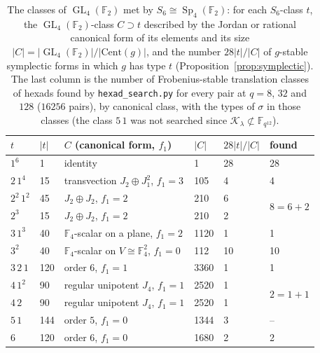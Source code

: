 ﻿\documentclass[12pt,a4paper]{amsart}
\theoremstyle{definition}
\newcommand{\F}{\mathbb{F}}
\newcommand{\Sp}{\operatorname{Sp}}
\newcommand{\GL}{\operatorname{GL}}
\newcommand{\Kk}{\mathcal{K}}
\begin{document}
\begin{table}[H]
\centering
\caption{The classes of $\GL_4(\F_2)$ met by $S_6\cong\Sp_4(\F_2)$: for each $S_6$-class $t$, the $\GL_4(\F_2)$-class $C\supset t$ described by the Jordan or rational canonical form of its elements and its size $|C|=|\GL_4(\F_2)|/|\mathrm{Cent}(g)|$, and the number $28|t|/|C|$ of $g$-stable symplectic forms in which $g$ has type $t$ (Proposition~\ref{prop:symplectic}). The last column is the number of Frobenius-stable translation classes of hexads found by \texttt{hexad\_search.py} for every pair at $q=8$, $32$ and $128$ ($16256$ pairs), by canonical class, with the types of $\sigma$ in those classes (the class $5\,1$ was not searched since $\Kk_\lambda\not\subset\F_{q^{12}}$).}\label{tab:symplectic}
\small
\begin{tabular}{@{}llllll@{}}
\toprule
$t$ & $|t|$ & $C$ (canonical form, $f_1$) & $|C|$ & $28|t|/|C|$ & found\\
\midrule
$1^6$ & 1 & identity & 1 & 28 & 28\\
$2\,1^4$ & 15 & transvection $J_2\oplus J_1^2$, $f_1=3$ & 105 & 4 & 4\\
$2^2\,1^2$ & 45 & $J_2\oplus J_2$, $f_1=2$ & 210 & 6 & \multirow{2}{*}{$8=6+2$}\\
$2^3$ & 15 & $J_2\oplus J_2$, $f_1=2$ & 210 & 2 & \\
$3\,1^3$ & 40 & $\F_4$-scalar on a plane, $f_1=2$ & 1120 & 1 & 1\\
$3^2$ & 40 & $\F_4$-scalar on $V\cong\F_4^2$, $f_1=0$ & 112 & 10 & 10\\
$3\,2\,1$ & 120 & order $6$, $f_1=1$ & 3360 & 1 & 1\\
$4\,1^2$ & 90 & regular unipotent $J_4$, $f_1=1$ & 2520 & 1 & \multirow{2}{*}{$2=1+1$}\\
$4\,2$ & 90 & regular unipotent $J_4$, $f_1=1$ & 2520 & 1 & \\
$5\,1$ & 144 & order $5$, $f_1=0$ & 1344 & 3 & --\\
$6$ & 120 & order $6$, $f_1=0$ & 1680 & 2 & 2\\
\bottomrule
\end{tabular}
\end{table}
\end{document}
